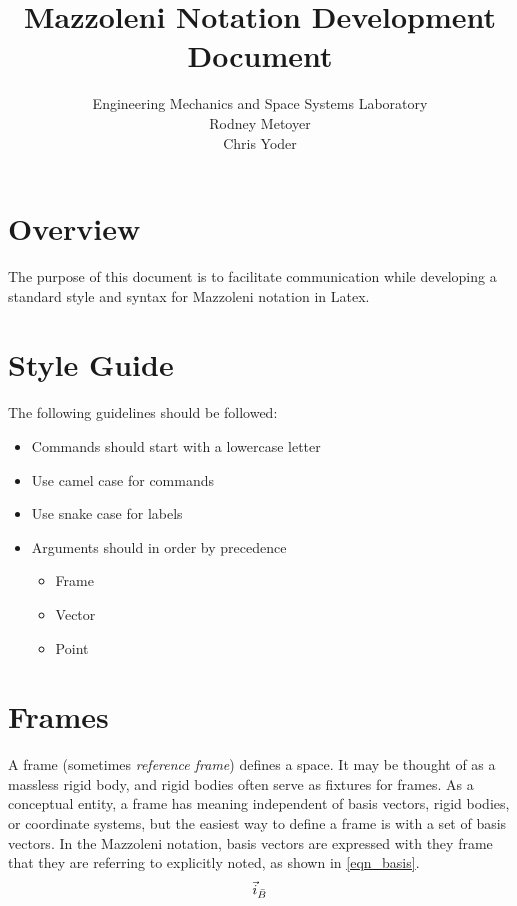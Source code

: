 \documentclass{article}
\begin{document}
	
	\title{Mazzoleni Notation Development Document}
	\author{Engineering Mechanics and Space Systems Laboratory\\
	Rodney Metoyer\\
	Chris Yoder}
	
	\maketitle
	
	\section{Overview}
	The purpose of this document is to facilitate communication while developing a standard style and syntax for Mazzoleni notation in Latex.
	
	\section{Style Guide}
	The following guidelines should be followed:
	\begin{itemize}
		\item Commands should start with a lowercase letter
		\item Use camel case for commands
		\item Use snake case for labels
		\item Arguments should in order by precedence
			\begin{itemize}
				\item Frame
				\item Vector
				\item Point
			\end{itemize}
	\end{itemize}
		
	\section{Frames}
	A frame (sometimes \textit{reference frame}) defines a space. It may be thought of as a massless rigid body, and rigid bodies often serve as fixtures for frames. As a conceptual entity, a frame has meaning independent of basis vectors, rigid bodies, or coordinate systems, but the easiest way to define a frame is with a set of basis vectors. In the Mazzoleni notation, basis vectors are expressed with they frame that they are referring to explicitly noted, as shown in \ref{eqn_basis}.
	\begin{equation}
	\label{eqn_basis}
	\vec{i}_{\bar{B}}
	\end{equation}
	
\end{document}
